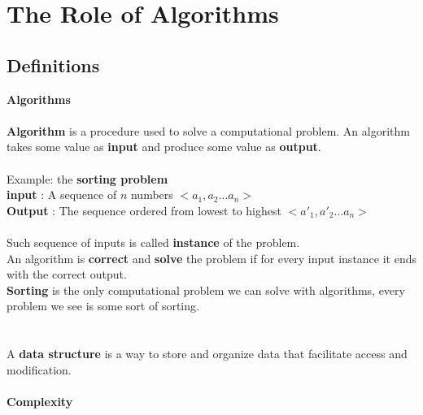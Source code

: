 \chapter{The Role of Algorithms}
\section{Definitions}
{\Large\textbf{Algorithms}}\\\\ 
\textbf{Algorithm} is a procedure used to solve a computational problem.
An algorithm takes some value as \textbf{input} and produce some value as \textbf{output}.
\\\\
Example: the \textbf{sorting problem}\\
\indent \textbf{input} : A sequence of $n$ numbers $<a_1,a_2\dots a_n>$\\
\indent \textbf{Output} : The sequence ordered from lowest to highest $<a'_{1},a'_{2}\dots a_n>$
\\\\
Such sequence of inputs is called \textbf{instance} of the problem.\\
An algorithm is \textbf{correct} and \textbf{solve} the problem if for every input instance it ends with the correct output.\\
\textbf{Sorting} is the only computational problem we can solve with algorithms, every problem we see is some sort of sorting.\\ 
\\
\\ 
A \textbf{data structure} is a way to store and organize data that facilitate access and modification. 
\\\\
{\Large\textbf{Complexity}}\\\\



    


